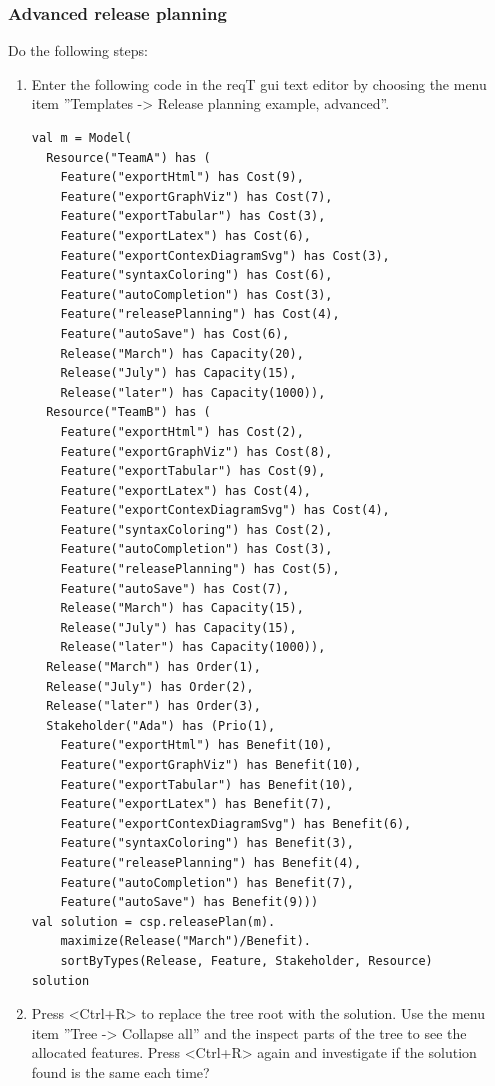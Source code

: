 \documentclass[11pt]{article}
\begin{document}
\subsubsection{Advanced release planning}
\begin{framed}
\noindent Do the following steps: 

\begin{enumerate}
\item Enter the following code in the reqT gui text editor by choosing the menu item ''Templates -> Release planning example, advanced''.

\begin{lstlisting}
val m = Model(
  Resource("TeamA") has (
    Feature("exportHtml") has Cost(9),
    Feature("exportGraphViz") has Cost(7),
    Feature("exportTabular") has Cost(3),
    Feature("exportLatex") has Cost(6),
    Feature("exportContexDiagramSvg") has Cost(3),    
    Feature("syntaxColoring") has Cost(6),
    Feature("autoCompletion") has Cost(3),    
    Feature("releasePlanning") has Cost(4),    
    Feature("autoSave") has Cost(6),    
    Release("March") has Capacity(20),
    Release("July") has Capacity(15),
    Release("later") has Capacity(1000)),
  Resource("TeamB") has (
    Feature("exportHtml") has Cost(2),
    Feature("exportGraphViz") has Cost(8),
    Feature("exportTabular") has Cost(9),
    Feature("exportLatex") has Cost(4),
    Feature("exportContexDiagramSvg") has Cost(4),
    Feature("syntaxColoring") has Cost(2),    
    Feature("autoCompletion") has Cost(3),    
    Feature("releasePlanning") has Cost(5),    
    Feature("autoSave") has Cost(7),    
    Release("March") has Capacity(15),
    Release("July") has Capacity(15),
    Release("later") has Capacity(1000)),
  Release("March") has Order(1),
  Release("July") has Order(2),
  Release("later") has Order(3),
  Stakeholder("Ada") has (Prio(1), 
    Feature("exportHtml") has Benefit(10),
    Feature("exportGraphViz") has Benefit(10),
    Feature("exportTabular") has Benefit(10),
    Feature("exportLatex") has Benefit(7),
    Feature("exportContexDiagramSvg") has Benefit(6),
    Feature("syntaxColoring") has Benefit(3),    
    Feature("releasePlanning") has Benefit(4),    
    Feature("autoCompletion") has Benefit(7),    
    Feature("autoSave") has Benefit(9)))
val solution = csp.releasePlan(m).
    maximize(Release("March")/Benefit).
    sortByTypes(Release, Feature, Stakeholder, Resource)
solution
\end{lstlisting}

\item Press <Ctrl+R> to replace the tree root with the solution. Use the menu item ''Tree -> Collapse all'' and the inspect parts of the tree to see the allocated features. Press <Ctrl+R> again and investigate if the solution found is the same each time?


\end{enumerate}
\end{framed}
\end{document}
